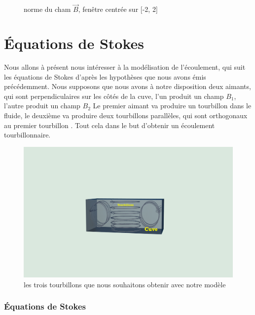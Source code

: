 \documentclass[a4paper,12pt,titlepage]{report}
\begin{document}
\begin{onehalfspace}
\begin{figure}[!h]
\begin{center}
\caption{norme du cham $\vec{B}$, fenêtre centrée sur [-2, 2]}
\label{figure 1}
\end{center}
\end{figure}
\newpage
\chapter{Équations de Stokes} 
Nous allons à présent nous intéresser à la modélisation de l'écoulement, qui suit les équations de Stokes d'après les hypothèses que nous avons émis précédemment. 
Nous supposons que nous avons à notre disposition deux aimants, qui sont perpendiculaires sur les côtés de la cuve, l'un produit un champ $B_1$, l'autre produit un champ $B_2$
Le premier aimant va produire un tourbillon dans le fluide, le deuxième va produire deux tourbillons parallèles, qui sont orthogonaux au premier tourbillon . Tout cela dans le but d'obtenir un écoulement tourbillonnaire. 
\begin{figure}[!h]
\begin{center}
\includegraphics[height = 8 cm, keepaspectratio]{graphes/3_tourbillons.png}
\caption{les trois tourbillons que nous souhaitons obtenir avec notre modèle}
\label{figure 1}
\end{center}
\end{figure}
\newpage
\subsection{Équations de Stokes}


\end{onehalfspace}
\end{document}
